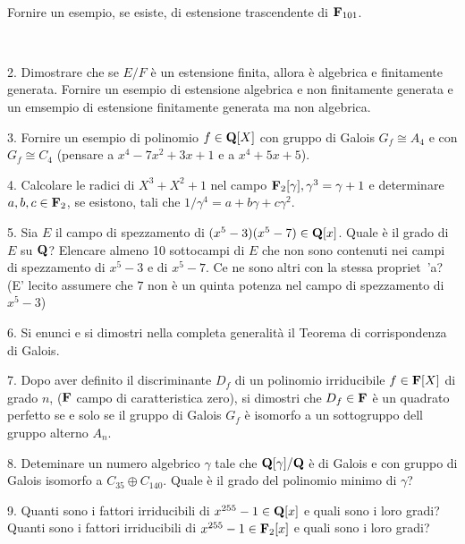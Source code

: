 \ \dotfill\ \bigskip\bigskip\bigskip\vfil

 Fornire un esempio, se esiste, di estensione trascendente di ${\bf F}_{101}$.\medskip\bigskip\bigskip

\ \dotfill\ \bigskip\bigskip\bigskip

\vfil\eject


\item{2.} Dimostrare che se $E/F$ \`e un estensione finita, allora \`e algebrica e finitamente generata. Fornire un esempio di estensione algebrica e 
non finitamente generata  e un emsempio di estensione finitamente generata ma non algebrica.  
\vv


\item{3.} Fornire un esempio di polinomio $f\in{\bf Q}[X]$ con gruppo di Galois $G_f\cong A_4$ e con $G_f\cong C_4$ (pensare a $x^4 - 7x^2 + 3x + 1$ e 
a $x^4+5x+5$).\vv



\item{4.} Calcolare le radici di $X^3+X^2+1$ nel campo ${\bf F}_2[\gamma], \gamma^3=\gamma+1$ e determinare $a,b,c\in{\bf F}_2$, se esistono,
tali che $1/\gamma^4=a+b\gamma+c\gamma^2$.  
\ve\ \vs

\item{5.} Sia $E$ il campo di spezzamento di $(x^5-3)(x^5-7)\in{\bf Q}[x]$. Quale \`e il grado di $E$ su ${\bf Q}$?
Elencare almeno 10 sottocampi di $E$ che non sono contenuti nei campi di spezzamento di $x^5-3$ e di $x^5-7$. Ce ne sono altri con la stessa propriet\ 'a? 
(E' lecito assumere
che $7$ non \`e un quinta potenza nel campo di spezzamento di $x^5-3$)
\vv


\item{6.} Si enunci e si dimostri nella completa generalit\`a il Teorema di
corrispondenza di Galois.\vv


\item{7.} Dopo aver definito il discriminante $D_f$ di un polinomio irriducibile $f\in{\bf F}[X]$ di grado $n$, (${\bf F}$ campo di caratteristica zero), 
si dimostri che $D_f\in{\bf F}$ \`e un quadrato perfetto se e solo se il gruppo di Galois $G_f$ \`e isomorfo a un sottogruppo dell
gruppo alterno $A_n$.\ve\ \vs

\item{8.} Deteminare un numero algebrico $\gamma$ tale che ${\bf Q}[\gamma]/{\bf Q}$ \`e di Galois e con gruppo di Galois isomorfo a 
$C_{35}\oplus C_{140}$. Quale \`e il grado del polinomio minimo di $\gamma$?
\vv

\item{9.} 
 Quanti sono i fattori irriducibili di $x^{255}-1\in{\bf Q}[x]$ e quali sono i loro gradi?
 Quanti sono i fattori irriducibili di $x^{255}-1\in{\bf F}_2[x]$ e quali sono i loro gradi?
\ \vst
 \bye
